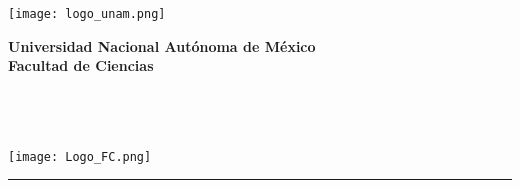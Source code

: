 
\begin{center}
    \begin{minipage}{3cm}
        \begin{center}
            \texttt{[image: logo\_unam.png]}
        \end{center}
    \end{minipage}\hfill
    \begin{minipage}{10cm}
        \begin{center}
            \textbf{\large Universidad Nacional Autónoma de México}\\[0.1cm]
            \textbf{Facultad de Ciencias}\\[0.1cm]
            \textbf{\materia}\\[0.1cm]
            \tarea\\[0.1cm]
            \autor\\[0.1cm]
            \fecha{}
        \end{center}
    \end{minipage}\hfill
    \begin{minipage}{3cm}
        \begin{center}
            \texttt{[image: Logo\_FC.png]}
        \end{center}
    \end{minipage}
\end{center}

\noindent\rule{\textwidth}{0.01cm}\\

\begin{center}
    {\huge \tarea}
\end{center}
